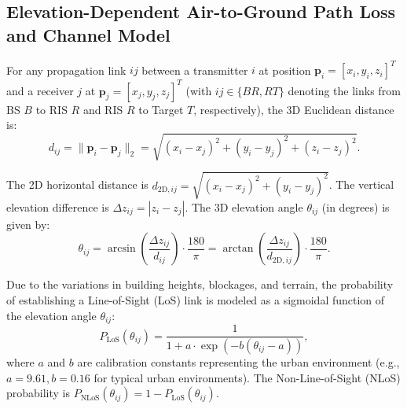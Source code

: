 \documentclass[journal,onecolumn]{IEEEtran}
\begin{document}
\subsection{Elevation-Dependent Air-to-Ground Path Loss and Channel Model}
For any propagation link $ij$ between a transmitter $i$ at position $\mathbf{p}_i = [x_i, y_i, z_i]^T$ and a receiver $j$ at $\mathbf{p}_j = [x_j, y_j, z_j]^T$ (with $ij \in \{BR, RT\}$ denoting the links from BS $B$ to RIS $R$ and RIS $R$ to Target $T$, respectively), the 3D Euclidean distance is:
\begin{equation}
    d_{ij} = \|\mathbf{p}_i - \mathbf{p}_j\|_2 = \sqrt{(x_i - x_j)^2 + (y_i - y_j)^2 + (z_i - z_j)^2}.
\end{equation}

The 2D horizontal distance is $d_{\text{2D}, ij} = \sqrt{(x_i - x_j)^2 + (y_i - y_j)^2}$. The vertical elevation difference is $\Delta z_{ij} = |z_i - z_j|$. The 3D elevation angle $\theta_{ij}$ (in degrees) is given by:
\begin{equation}
    \theta_{ij} = \arcsin\left( \frac{\Delta z_{ij}}{d_{ij}} \right) \cdot \frac{180}{\pi} = \arctan\left( \frac{\Delta z_{ij}}{d_{\text{2D}, ij}} \right) \cdot \frac{180}{\pi}.
\end{equation}

Due to the variations in building heights, blockages, and terrain, the probability of establishing a Line-of-Sight (LoS) link is modeled as a sigmoidal function of the elevation angle $\theta_{ij}$:
\begin{equation}
    P_{\text{LoS}}(\theta_{ij}) = \frac{1}{1 + a \cdot \exp\left( -b (\theta_{ij} - a) \right)},
\end{equation}
where $a$ and $b$ are calibration constants representing the urban environment (e.g., $a = 9.61, b = 0.16$ for typical urban environments). The Non-Line-of-Sight (NLoS) probability is $P_{\text{NLoS}}(\theta_{ij}) = 1 - P_{\text{LoS}}(\theta_{ij})$.
\end{document}
